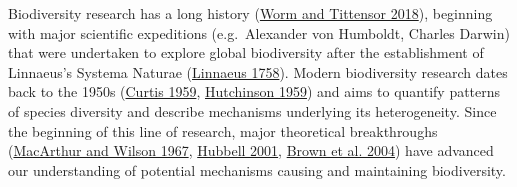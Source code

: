 \documentclass[
  12pt,
]{article}
\begin{document}
Biodiversity research has a long history (\protect\hyperlink{ref-worm2018theory}{Worm and Tittensor 2018}), beginning with major scientific expeditions (e.g.~Alexander von Humboldt, Charles Darwin) that were undertaken to explore global biodiversity after the establishment of Linnaeus's Systema Naturae (\protect\hyperlink{ref-linnaeus1758systema}{Linnaeus 1758}). Modern biodiversity research dates back to the 1950s (\protect\hyperlink{ref-curtis1959vegetation}{Curtis 1959}, \protect\hyperlink{ref-hutchinson1959homage}{Hutchinson 1959}) and aims to quantify patterns of species diversity and describe mechanisms underlying its heterogeneity. Since the beginning of this line of research, major theoretical breakthroughs (\protect\hyperlink{ref-macarthur1967theory}{MacArthur and Wilson 1967}, \protect\hyperlink{ref-hubbell2001unified}{Hubbell 2001}, \protect\hyperlink{ref-brown2004toward}{Brown et al. 2004}) have advanced our understanding of potential mechanisms causing and maintaining biodiversity.
\end{document}
